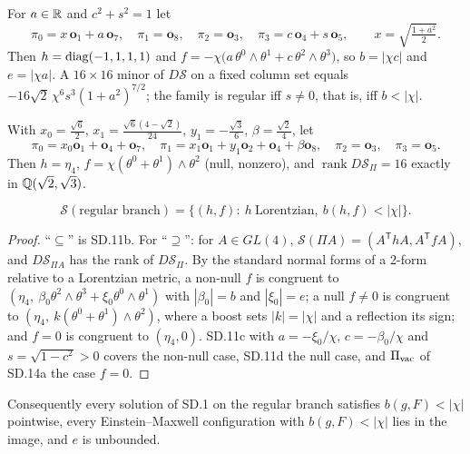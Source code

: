 \documentclass[10pt]{article}
\newcommand{\rankop}{\operatorname{rank}}
\begin{document}
\begin{proposition}
For $a\in\mathbb R$ and $c^2+s^2=1$ let
\[
\pi_0=x\,\mathbf o_1+a\,\mathbf o_7,\quad
\pi_1=\mathbf o_8,\quad
\pi_2=\mathbf o_3,\quad
\pi_3=c\,\mathbf o_4+s\,\mathbf o_5,
\qquad x=\sqrt{\tfrac{1+a^2}2}.
\tag{SD.11c}
\]
Then $h=\operatorname{diag}(-1,1,1,1)$ and
$f=-\chi\bigl(a\,\theta^0\wedge\theta^1+c\,\theta^2\wedge\theta^3\bigr)$, so
$b=|\chi c|$ and $e=|\chi a|$. A $16\times16$ minor of $D\mathscr S$ on a fixed
column set equals $-16\sqrt2\,\chi^{6}s^3(1+a^2)^{7/2}$; the family is regular iff
$s\ne0$, that is, iff $b<|\chi|$.
\end{proposition}

\begin{proposition}
With $x_0=\tfrac{\sqrt6}2$, $x_1=\tfrac{\sqrt6(4-\sqrt2)}{24}$,
$y_1=-\tfrac{\sqrt3}6$, $\beta=\tfrac{\sqrt2}4$, let
\[
\pi_0=x_0\mathbf o_1+\mathbf o_4+\mathbf o_7,\quad
\pi_1=x_1\mathbf o_1+y_1\mathbf o_2+\mathbf o_4+\beta\mathbf o_8,\quad
\pi_2=\mathbf o_3,\quad
\pi_3=\mathbf o_5.
\tag{SD.11d}
\]
Then $h=\eta_4$, $f=\chi(\theta^0+\theta^1)\wedge\theta^2$ (null, nonzero), and
$\rankop D\mathscr S_\Pi=16$ exactly in $\mathbb Q(\sqrt2,\sqrt3)$.
\end{proposition}

\begin{theorem}[Image]
\[
\mathscr S(\text{regular branch})
=\{(h,f):\ h\ \text{Lorentzian},\ b(h,f)<|\chi|\}.
\tag{SD.11e}
\]
\end{theorem}

\begin{proof}
``$\subseteq$'' is SD.11b. For ``$\supseteq$'': for $A\in GL(4)$,
$\mathscr S(\Pi A)=(A^{\mathsf T}hA,A^{\mathsf T}fA)$, and $D\mathscr S_{\Pi A}$
has the rank of $D\mathscr S_\Pi$. By the standard normal forms of a 2-form
relative to a Lorentzian metric, a non-null $f$ is congruent to
$(\eta_4,\ \beta_0\theta^2\wedge\theta^3+\xi_0\theta^0\wedge\theta^1)$
with $|\beta_0|=b$ and $|\xi_0|=e$; a null $f\ne0$ is congruent to
$(\eta_4,\ k(\theta^0+\theta^1)\wedge\theta^2)$, where a boost sets $|k|=|\chi|$
and a reflection its sign; and $f=0$ is congruent to $(\eta_4,0)$. SD.11c with
$a=-\xi_0/\chi$, $c=-\beta_0/\chi$ and $s=\sqrt{1-c^2}>0$ covers the
non-null case, SD.11d the null case, and $\Pi_{\rm vac}$ of SD.14a the case
$f=0$.
\end{proof}

Consequently every solution of SD.1 on the regular branch satisfies
$b(g,F)<|\chi|$ pointwise, every Einstein--Maxwell configuration with
$b(g,F)<|\chi|$ lies in the image, and $e$ is unbounded.
\end{document}
